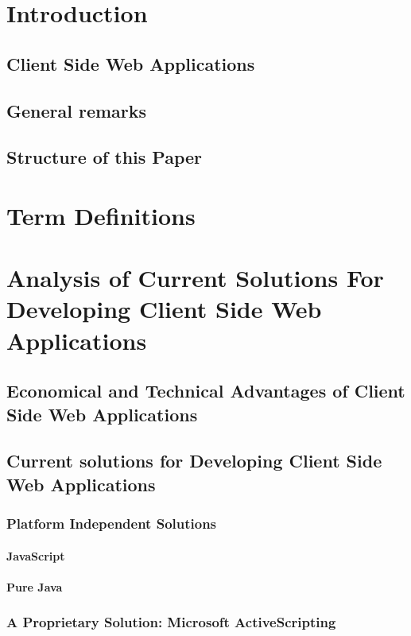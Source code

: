 

\tableofcontents
\newpage


\section{Introduction}
 
 
 \subsection{Client Side Web Applications}
 \subsection{General remarks}
 \subsection{Structure of this Paper}
\section{Term Definitions}
\section{Analysis of Current Solutions For Developing Client Side Web Applications}
 \subsection{Economical and Technical Advantages of Client Side Web Applications}
 \subsection{Current solutions for Developing Client Side Web Applications}
  \subsubsection{Platform Independent Solutions}
   \paragraph{JavaScript}
   
   \paragraph{Pure Java}
  \subsubsection{A Proprietary Solution: Microsoft ActiveScripting}
